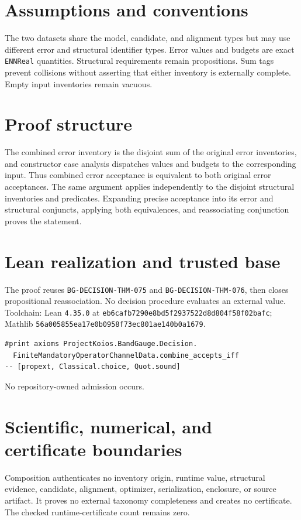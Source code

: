 \documentclass[10pt]{article}
\begin{document}
\section{Assumptions and conventions}
The two datasets share the model, candidate, and alignment types but may use different error and
structural identifier types. Error values and budgets are exact \texttt{ENNReal} quantities.
Structural requirements remain propositions. Sum tags prevent collisions without asserting that
either inventory is externally complete. Empty input inventories remain vacuous.

\section{Proof structure}
The combined error inventory is the disjoint sum of the original error inventories, and constructor
case analysis dispatches values and budgets to the corresponding input. Thus combined error
acceptance is equivalent to both original error acceptances. The same argument applies independently
to the disjoint structural inventories and predicates. Expanding precise acceptance into its error
and structural conjuncts, applying both equivalences, and reassociating conjunction proves the
statement.

\section{Lean realization and trusted base}
The proof reuses \texttt{BG-DECISION-THM-075} and \texttt{BG-DECISION-THM-076}, then closes
propositional reassociation. No decision procedure evaluates an external value. Toolchain: Lean
\texttt{4.35.0} at \texttt{eb6cafb7290e8bd5f2937522d8d804f58f02bafc}; Mathlib
\texttt{56a005855ea17e0b0958f73ec801ae140b0a1679}.
\begin{verbatim}
#print axioms ProjectKoios.BandGauge.Decision.
  FiniteMandatoryOperatorChannelData.combine_accepts_iff
-- [propext, Classical.choice, Quot.sound]
\end{verbatim}
No repository-owned admission occurs.

\section{Scientific, numerical, and certificate boundaries}
Composition authenticates no inventory origin, runtime value, structural evidence, candidate,
alignment, optimizer, serialization, enclosure, or source artifact. It proves no external taxonomy
completeness and creates no certificate. The checked runtime-certificate count remains zero.
\end{document}
